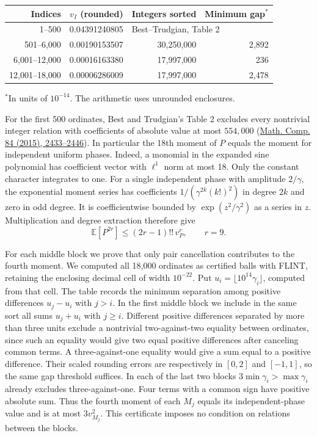 \begin{center}\small
\begin{tabular}{r r r r}
\hline
Indices & $v_I$ (rounded) & Integers sorted & Minimum gap${}^{*}$\\ \hline
1--500 & 0.04391240805 & \multicolumn{2}{l}{Best--Trudgian, Table 2}\\
501--6,000 & 0.00190153507 & 30,250,000 & 2,892\\
6,001--12,000 & 0.00016163380 & 17,997,000 & 236\\
12,001--18,000 & 0.00006286009 & 17,997,000 & 2,478\\ \hline
\end{tabular}

${}^{*}$In units of $10^{-14}$. The arithmetic uses unrounded enclosures.
\end{center}

For the first 500 ordinates, Best and Trudgian's Table 2 excludes every
nontrivial integer relation with coefficients of absolute value at most
$554,000$ (\href{https://arxiv.org/abs/1209.3843}{Math. Comp. 84 (2015), 2433--2446}).
In particular the 18th moment of $P$ equals the moment for independent
uniform phases. Indeed, a monomial in the expanded sine polynomial
has coefficient vector with $\ell^1$ norm at most 18. Only the constant
character integrates to one. For a single independent phase with
amplitude $2/\gamma$, the exponential moment series has coefficients
$1/(\gamma^{2k}(k!)^2)$ in degree $2k$ and zero in odd degree. It is
coefficientwise bounded by $\exp(z^2/\gamma^2)$ as a series in $z$.
Multiplication and degree extraction therefore give
\[
 \mathbb E[P^{2r}]\le (2r-1)!!\,v_P^r,\qquad r=9.
\]

For each middle block we prove that only pair cancellation contributes
to the fourth moment. We computed all 18,000 ordinates as certified balls
with FLINT, retaining the enclosing decimal cell of width $10^{-22}$.
Put $u_i=\lfloor10^{14}\gamma_i\rfloor$, computed from that cell.
The table records the minimum separation among positive differences
$u_j-u_i$ with $j>i$. In the first middle block we include in the same
sort all sums $u_j+u_i$ with $j\ge i$. Different positive differences
separated by more than three units exclude a nontrivial two-against-two
equality between ordinates, since such an equality would give two equal
positive differences after canceling common terms. A three-against-one
equality would give a sum equal to a positive difference. Their scaled
rounding errors are respectively in $[0,2]$ and $[-1,1]$, so the same
gap threshold suffices. In each of the last two blocks $3\min\gamma_i>
\max\gamma_i$ already excludes three-against-one. Four terms with a
common sign have positive absolute sum. Thus the fourth moment of
each $M_j$ equals its independent-phase value and is at most $3v_{M_j}^2$.
This certificate imposes no condition on relations between the blocks.

